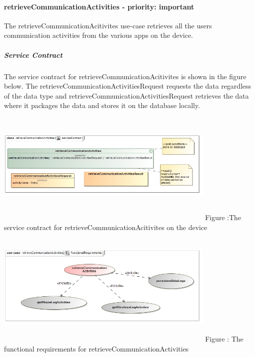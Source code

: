 \documentclass[hidelinks, 12pt, oneside]{article}
\begin{document}
	\paragraph{retrieveCommunicationActivities - priority: important}
		The retrieveCommunicationAcitivites use-case retrieves all the users communication activities from the various apps on the device.\newline
\subparagraph{Service Contract}
		The service contract for retrieveCommunicationAcitivites is shown in the figure below. The retrieveCommunicationActivitiesRequest requests the data regardless of the data type and retrieveCommunicationActivitiesRequest retrieves the data where it packages the data and stores it on the database locally.\newline\newline	
	\includegraphics[width=400px,height=220px]{img/serviceContractRetrieveCommunicationActivities.jpg}
		Figure :The service contract for retrieveCommunicationAcitivites on the device\newline
	\includegraphics[width=400px,height=220px]{img/functionalRequirementsRetrieveCommunicationActivities.jpg}
		Figure : The functional requirements for retrieveCommunicationActivities\newline
		
			
\end{document}
